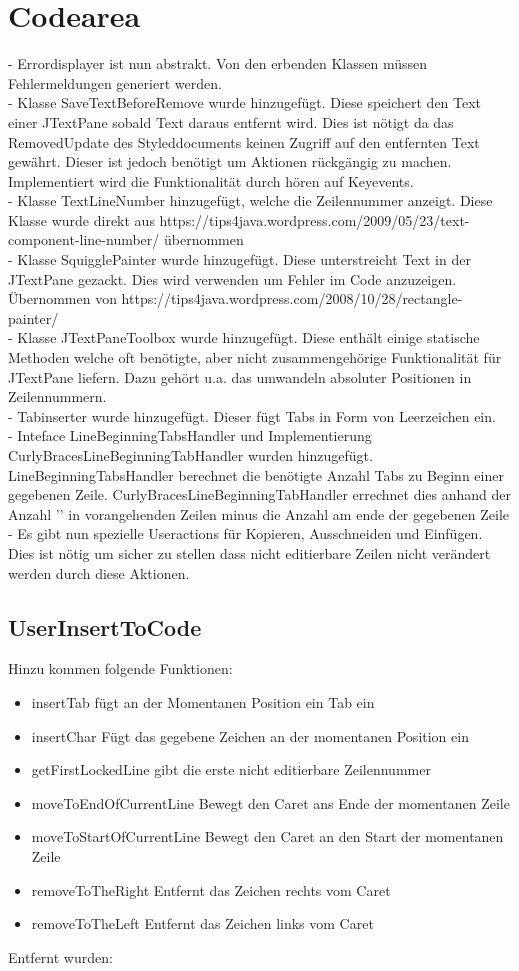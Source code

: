 \documentclass[a4paper]{scrreprt}
\begin{document}
\section{Codearea}
- Errordisplayer ist nun abstrakt. Von den erbenden Klassen müssen Fehlermeldungen generiert werden.\\
- Klasse SaveTextBeforeRemove wurde hinzugefügt. Diese speichert den Text einer JTextPane sobald Text daraus entfernt wird. Dies ist nötigt da das RemovedUpdate des Styleddocuments keinen Zugriff auf den entfernten Text gewährt. Dieser ist jedoch benötigt um Aktionen rückgängig zu machen. Implementiert wird die Funktionalität durch hören auf Keyevents.\\
- Klasse TextLineNumber hinzugefügt, welche die Zeilennummer anzeigt. Diese Klasse wurde direkt aus https://tips4java.wordpress.com/2009/05/23/text-component-line-number/ übernommen\\
- Klasse SquigglePainter wurde hinzugefügt. Diese unterstreicht Text in der JTextPane gezackt. Dies wird verwenden um Fehler im Code anzuzeigen. Übernommen von 
https://tips4java.wordpress.com/2008/10/28/rectangle-painter/\\
- Klasse JTextPaneToolbox wurde hinzugefügt. Diese enthält einige statische Methoden welche oft benötigte, aber nicht zusammengehörige Funktionalität für JTextPane liefern. Dazu gehört u.a. das umwandeln absoluter Positionen in Zeilennummern.\\
- Tabinserter wurde hinzugefügt. Dieser fügt Tabs in Form von Leerzeichen ein.\\
- Inteface LineBeginningTabsHandler und Implementierung CurlyBracesLineBeginningTabHandler wurden hinzugefügt. LineBeginningTabsHandler berechnet die benötigte Anzahl Tabs zu Beginn einer gegebenen Zeile. CurlyBracesLineBeginningTabHandler errechnet dies anhand der Anzahl '{' in vorangehenden Zeilen minus die Anzahl } am ende der gegebenen Zeile\\
- Es gibt nun spezielle Useractions für Kopieren, Ausschneiden und Einfügen. Dies ist nötig um sicher zu stellen dass nicht editierbare Zeilen nicht verändert werden durch diese Aktionen.

\subsection{UserInsertToCode}
Hinzu kommen folgende Funktionen:
\begin{itemize}
\item insertTab fügt an der Momentanen Position ein Tab ein
\item insertChar Fügt das gegebene Zeichen an der momentanen Position ein
\item getFirstLockedLine gibt die erste nicht editierbare Zeilennummer
\item moveToEndOfCurrentLine Bewegt den Caret ans Ende der momentanen Zeile
\item moveToStartOfCurrentLine Bewegt den Caret an den Start der momentanen Zeile
\item removeToTheRight Entfernt das Zeichen rechts vom Caret
\item removeToTheLeft Entfernt das Zeichen links vom Caret
\end{itemize}
Entfernt wurden:
\end{document}
